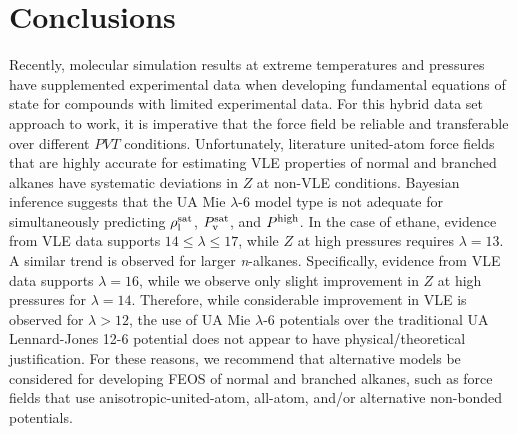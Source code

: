 \documentclass[preprint,letterpaper,floatfix,citeautoscript,aip,jcp]{revtex4-1}
\begin{document}
 
\section{Conclusions} \label{Conclusions}

Recently, molecular simulation results at extreme temperatures and pressures have supplemented experimental data when developing fundamental equations of state for compounds with limited experimental data. For this hybrid data set approach to work, it is imperative that the force field be reliable and transferable over different $PVT$ conditions. Unfortunately, literature united-atom force fields that are highly accurate for estimating VLE properties of normal and branched alkanes have systematic deviations in $Z$ at non-VLE conditions. Bayesian inference suggests that the UA Mie $\lambda$-6 model type is not adequate for simultaneously predicting $\rho_{\rm l}^{\rm sat}$, $P_{\rm v}^{\rm sat}$, and $P^{\rm high}$. In the case of ethane, evidence from VLE data supports $14 \le \lambda \le 17$, while $Z$ at high pressures requires $\lambda = 13$. A similar trend is observed for larger \textit{n}-alkanes. Specifically, evidence from VLE data supports $\lambda = 16$, while we observe only slight improvement in $Z$ at high pressures for $\lambda = 14$. Therefore, while considerable improvement in VLE is observed for $\lambda > 12$, the use of UA Mie $\lambda$-6 potentials over the traditional UA Lennard-Jones 12-6 potential does not appear to have physical/theoretical justification. 
%
For these reasons, we recommend that alternative models be considered for developing FEOS of normal and branched alkanes, such as force fields that use anisotropic-united-atom, all-atom, and/or alternative non-bonded potentials.
\end{document}

